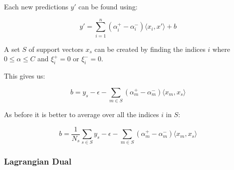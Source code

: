 Each new predictions $y'$ can be found using:

\begin{equation}
    y'=\displaystyle \sum_{i=1}^{n}(\alpha_i^+ - \alpha_i^-)\langle x_i, x' \rangle+b \tag{2.16}
\end{equation}

A set $S$ of support vectors $x_s$ can be created by finding the indices $i$ where $0\leq\alpha\leq C$ and $\xi_i^+=0$ or $\xi_i^-=0$.

This gives us:

\begin{equation}
    b=y_s-\displaystyle \epsilon-\sum_{m\in S}(\alpha_m^+ -\alpha_m^-) \langle x_m, x_s \rangle \tag{2.17}
\end{equation}

As before it is better to average over all the indices $i$ in $S$:

\begin{equation}
    b=\displaystyle \frac{1}{N_s}\sum_{s\in S}y_s-\epsilon-\sum_{m \in S}(\alpha_m^+ - \alpha_m^-)\langle x_m, x_s \rangle \tag{2.18}
\end{equation}

\subsubsection{Lagrangian Dual}

